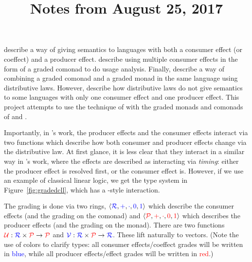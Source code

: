 \documentclass{article}
\title{Notes from August 25, 2017}
\newcommand{\consgrade}[1]{\textcolor{blue}{#1}}
\newcommand{\prodgrade}[1]{\textcolor{red}{#1}}
\newcommand{\Ufunc}{\textcolor{red}{\mathcal{U}}}
\newcommand{\Vfunc}{\textcolor{blue}{\mathcal{V}}}
\newcommand{\consring}{\consgrade{\mathcal{R}}}
\newcommand{\prodring}{\prodgrade{\mathcal{P}}}
\begin{document}
\maketitle

\citet{Hirsch} describe a way of giving semantics to languages with both a consumer effect (or coeffect) and a producer effect.
\citet{Brunel} describe using multiple consumer effects in the form of a graded comonad to do usage analysis.
Finally, \citet{Gaboardi} describe a way of combining a graded comonad and a graded monad in the same language using distributive laws.
However, \citet{Hirsch} describe how distributive laws do not give semantics to some languages with only one consumer effect and one producer effect.
This project attempts to use the technique of \citet{Hirsch} with the graded monads and comonads of \citet{Brunel} and \citet{Gaboardi}.

Importantly, in \citet{Gaboardi}'s work, the producer effects and the consumer effects interact via two functions which describe how both consumer and producer effects change via the distributive law.
At first glance, it is less clear that they interact in a similar way in \citet{Hirsch}'s work, where the effects are described as interacting via \emph{timing}: either the producer effect is resolved first, or the consumer effect is.
However, if we use an example of classical linear logic, we get the type system in Figure~\ref{fig:gradedcll}, which has a \citet{Gaboardi}-style interaction.

The grading is done via two rings, $\langle \consring, \consgrade{+}, \consgrade{\cdot}, \consgrade{0}, \consgrade{1} \rangle$ which describe the consumer effects (and the grading on the comonad) and $\langle \prodring, \prodgrade{+}, \prodgrade{\cdot}, \prodgrade{0}, \prodgrade{1} \rangle$ which describes the producer effects (and the grading on the monad).
There are two functions $\Ufunc :\consring \times \prodring \to \prodring$ and $\Vfunc : \consring \times \prodring \to \consring$.
These lift naturally to vectors.
(Note the use of colors to clarify types: all consumer effects/coeffect grades will be written in \consgrade{blue}, while all producer effects/effect grades will be written in \prodgrade{red}.)
\end{document}
